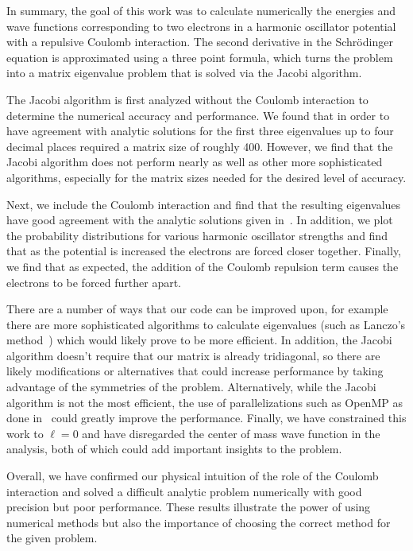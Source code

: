 \documentclass[prc,amsmath,twocolumn,superscriptaddress]{revtex4}
\begin{document}
In summary, the goal of this work was to calculate numerically the energies and wave functions corresponding to two electrons in a harmonic oscillator potential with a repulsive Coulomb interaction. The second derivative in the Schr{\"o}dinger equation is approximated using a three point formula, which turns the problem into a matrix eigenvalue problem that is solved via the Jacobi algorithm.

The Jacobi algorithm is first analyzed without the Coulomb interaction to determine the numerical accuracy and performance. We found that in order to have agreement with analytic solutions for the first three eigenvalues up to four decimal places required a matrix size of roughly 400. However, we find that the Jacobi algorithm does not perform nearly as well as other more sophisticated algorithms, especially for the matrix sizes needed for the desired level of accuracy.

Next, we include the Coulomb interaction and find that the resulting eigenvalues have good agreement with the analytic solutions given in~\cite{interact}. In addition, we plot the probability distributions for various harmonic oscillator strengths and find that as the potential is increased the electrons are forced closer together. Finally, we find that as expected, the addition of the Coulomb repulsion term causes the electrons to be forced further apart.

There are a number of ways that our code can be improved upon, for example there are more sophisticated algorithms to calculate eigenvalues (such as Lanczo's method~\cite{lan}) which would likely prove to be more efficient. In addition, the Jacobi algorithm doesn't require that our matrix is already tridiagonal, so there are likely modifications or alternatives that could increase performance by taking advantage of the symmetries of the problem. Alternatively, while the Jacobi algorithm is not the most efficient, the use of parallelizations such as OpenMP as done in~\cite{cmse} could greatly improve the performance. Finally, we have constrained this work to $\ell=0$ and have disregarded the center of mass wave function in the analysis, both of which could add important insights to the problem. 

Overall, we have confirmed our physical intuition of the role of the Coulomb interaction and solved a difficult analytic problem numerically with good precision but poor performance. These results illustrate the power of using numerical methods but also the importance of choosing the correct method for the given problem.


\end{document}
